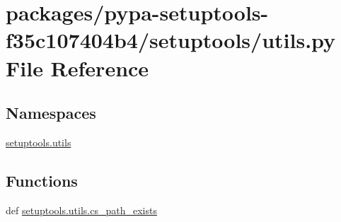 \hypertarget{pypa-setuptools-f35c107404b4_2setuptools_2utils_8py}{}\section{packages/pypa-\/setuptools-\/f35c107404b4/setuptools/utils.py File Reference}
\label{pypa-setuptools-f35c107404b4_2setuptools_2utils_8py}
\subsection*{Namespaces}
\begin{DoxyCompactItemize}
\item 
 \hyperlink{namespacesetuptools_1_1utils}{setuptools.\+utils}
\end{DoxyCompactItemize}
\subsection*{Functions}
\begin{DoxyCompactItemize}
\item 
def \hyperlink{namespacesetuptools_1_1utils_ac7c5acaec4101608ab258e1c0425a2fa}{setuptools.\+utils.\+cs\+\_\+path\+\_\+exists}
\end{DoxyCompactItemize}
